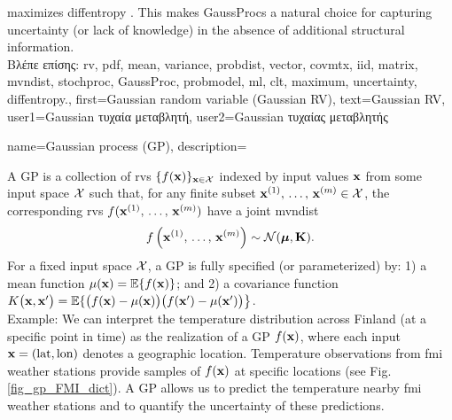 {{		maximizes \gls{diffentropy} \cite[Th. 8.6.5]{coverthomas}. This makes \gls{GaussProc}s a 
		natural choice for capturing \gls{uncertainty} (or lack of knowledge) in the absence of additional 
		structural information.
		\\
		\foreignlanguage{greek}{Βλέπε επίσης:} \gls{rv}, \gls{pdf}, \gls{mean}, \gls{variance}, \gls{probdist}, \gls{vector}, \gls{covmtx}, 
		\gls{iid}, \gls{matrix}, \gls{mvndist}, \gls{stochproc}, \gls{GaussProc}, \gls{probmodel}, \gls{ml}, \gls{clt}, \gls{maximum}, 
		\gls{uncertainty}, \gls{diffentropy}.},
	first={Gaussian random variable (Gaussian RV)},
	text={Gaussian RV},
	user1={Gaussian \foreignlanguage{greek}{τυχαία μεταβλητή}}, %
	user2={Gaussian \foreignlanguage{greek}{τυχαίας μεταβλητής}} %
}

{name={Gaussian process (GP)}, 
  description={A GP is a collection of \gls{rv}s 
  	$\{f(\featurevec)\}_{\featurevec \in \featurespace}$ indexed by input values $\featurevec$ 
  	from some input space $\featurespace$ such that, for any finite subset 
  	$\featurevec^{(1)}, \,\ldots, \,\featurevec^{(\samplesize)} \in \featurespace$, 
  	the corresponding \gls{rv}s $f(\featurevec^{(1)}, \,\ldots, \,\featurevec^{(\samplesize)})$ 
	have a joint \gls{mvndist} 
  	\[
  	f \left( \featurevec^{(1)}, \,\ldots, \,\featurevec^{(\samplesize)} \right) \sim \mathcal{N}(\boldsymbol{\mu}, \mathbf{K}).
  	\]
  	For a fixed input space $\featurespace$, a GP is fully specified (or parameterized) by: 1) a \gls{mean} \gls{function} 
	$\mu(\featurevec) = \expect\{ f(\featurevec)\}$; and 2) a \gls{covariance} \gls{function} 
	$\kernelmap{\featurevec}{\featurevec'}= \expect\{ \big(f(\featurevec)-\mu(\featurevec)\big) \big(f(\featurevec')-\mu(\featurevec')\big) \big\}$.\\
  	Example: We can interpret the temperature distribution across Finland (at a specific 
  	point in time) as the \gls{realization} of a GP $f(\featurevec)$, where each input $\featurevec = (\text{lat}, \text{lon})$ 
  	denotes a geographic location. Temperature observations from \gls{fmi} weather stations provide 
  	\gls{sample}s of $f(\featurevec)$ at specific locations (see Fig. \ref{fig_gp_FMI_dict}). A GP allows us to 
  	predict the temperature nearby \gls{fmi} weather stations and to quantify the \gls{uncertainty} 
  	of these \gls{prediction}s. 
  	\begin{figure}[H]
  	\begin{center}
  		\begin{tikzpicture}

\end{tikzpicture}
\end{center}
\end{figure}}}
